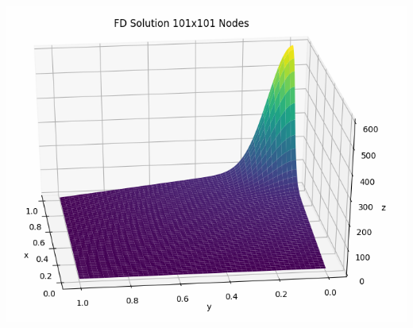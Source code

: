 \documentclass[11pt]{article}
\begin{document}
\includegraphics[width=15cm]{./figures/3d.png}

\newpage
\end{document}
